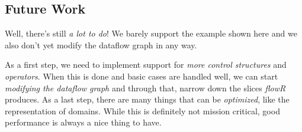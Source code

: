\documentclass[color,coloraccent=red!60!black,listings]{poster}
\def\flowr{\textit{flowR}}
\begin{document}
\begin{multicols}{3}
	\section*{Future Work}
	Well, there's still \emph{a lot to do}! We barely support the example shown here and
	we also don't yet modify the dataflow graph in any way.\par
	As a first step, we need to implement support for \emph{more control structures} and
	\emph{operators}. When this is done and basic cases are handled well, we can start
	\emph{modifying the dataflow graph} and through that, narrow down the slices
	\flowr{} produces. As a last step, there are many things that can be
	\emph{optimized}, like the representation of domains. While this is definitely not
	mission critical, good performance is always a nice thing to have.
\end{multicols}
\end{document}
